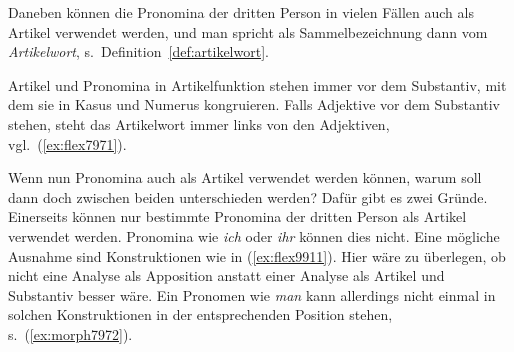 Daneben können die Pronomina der dritten Person in vielen Fällen auch als Artikel verwendet werden, und man spricht als Sammelbezeichnung dann vom \textit{Artikelwort}, s.\ Definition~\ref{def:artikelwort}.


Artikel und Pronomina in Artikelfunktion stehen immer vor dem Substantiv, mit dem sie in Kasus und Numerus kongruieren.
Falls Adjektive vor dem Substantiv stehen, steht das Artikelwort immer links von den Adjektiven, vgl.\ (\ref{ex:flex7971}).

\begin{exe}
  \ex \label{ex:flex7971}
  \begin{xlist}
  \end{xlist}
\end{exe}



Wenn nun Pronomina auch als Artikel verwendet werden können, warum soll dann doch zwischen beiden unterschieden werden?
Dafür gibt es zwei Gründe.
Einerseits können nur bestimmte Pronomina der dritten Person als Artikel verwendet werden.
Pronomina wie \textit{ich} oder \textit{ihr} können dies \zB nicht.
Eine mögliche Ausnahme sind Konstruktionen wie in (\ref{ex:flex9911}).
Hier wäre zu überlegen, ob nicht eine Analyse als Apposition anstatt einer Analyse als Artikel und Substantiv besser wäre.
Ein Pronomen wie \textit{man} kann allerdings nicht einmal in solchen Konstruktionen in der entsprechenden Position stehen, s.\ (\ref{ex:morph7972}).

\begin{exe}
  \ex\label{ex:flex9911}
  \begin{xlist}
  \end{xlist}
  \ex \label{ex:morph7972}
  \begin{xlist}
  \end{xlist}
\end{exe}

